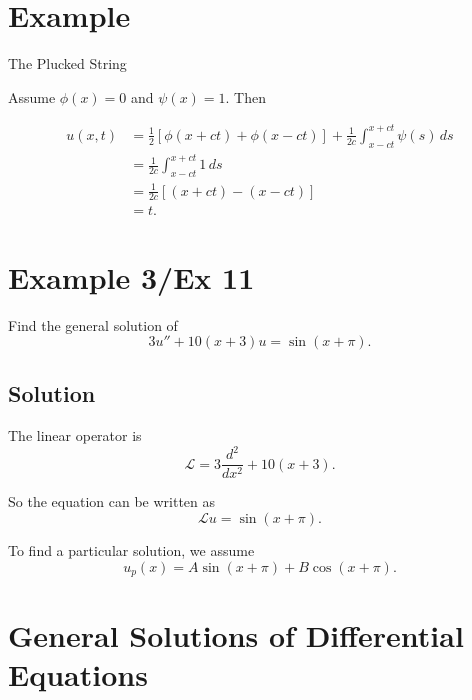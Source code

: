 \documentclass[11pt]{article}
\begin{document}
\section*{Example}

The Plucked String

Assume $\phi(x) = 0$ and $\psi(x) = 1$. Then

\begin{align*}
    u(x, t) &= \frac{1}{2} \left[ \phi(x+ct) + \phi(x-ct) \right] + \frac{1}{2c} \int_{x-ct}^{x+ct} \psi(s) \, ds \\
    &= \frac{1}{2c} \int_{x-ct}^{x+ct} 1 \, ds \\
    &= \frac{1}{2c} \left[ (x+ct) - (x-ct) \right] \\
    &= t.
\end{align*}





\section*{Example 3/Ex 11}

Find the general solution of 
\begin{equation}
    3u'' + 10(x + 3)u = \sin(x + \pi).
\end{equation}

\subsection*{Solution}

The linear operator is 
\begin{equation}
    \mathcal{L} = 3\frac{d^2}{dx^2} + 10(x + 3).
\end{equation}

So the equation can be written as 
\begin{equation}
    \mathcal{L}u = \sin(x + \pi).
\end{equation}

To find a particular solution, we assume 
\begin{equation}
    u_p(x) = A \sin(x + \pi) + B \cos(x + \pi).
\end{equation}



\clearpage

\section*{General Solutions of Differential Equations}
\end{document}
